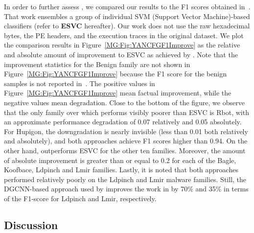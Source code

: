 In order to further assess \sysname, we compared our results to the F1 scores obtained in~\cite{YanDataset}.
That work ensembles a group of individual SVM (Support Vector Machine)-based classifiers (refer to \textbf{ESVC} hereafter). Our work does not use the raw hexadecimal bytes, the PE headers, and the execution traces in the original dataset.%
We plot the comparison results in Figure~\ref{MG:Fig:YANCFGF1Improve} as the relative and absolute amount of improvement to ESVC as achieved by \sysname.
Note that the improvement statistics for the Benign family are not shown in Figure~\ref{MG:Fig:YANCFGF1Improve} because the F1 score for the benign samples is not reported in~\cite{YanDataset}.
The positive values in Figure~\ref{MG:Fig:YANCFGF1Improve} mean factual improvement, while the negative values mean degradation.
Close to the bottom of the figure, we observe that the only family over which \sysname performs visibly poorer than ESVC is Rbot, with an approximate performance degradation of 0.07 relatively and 0.05 absolutely.
For Hupigon, the downgradation is nearly invisible (less than 0.01 both relatively and absolutely), and both approaches achieve F1 scores higher than 0.94.
On the other hand, \sysname outperforms ESVC for the other ten families.
Moreover, the amount of absolute improvement is greater than or equal to 0.2 for each of the Bagle, Koofbace, Ldpinch and Lmir families.
Lastly, it is noted that both approaches performed relatively poorly on the Ldpinch and Lmir malware families. Still, the DGCNN-based approach used by \sysname improves the work in \cite{YanDataset} by 70\% and 35\% in terms of the F1-score for Ldpinch and Lmir, respectively.


\subsection{Discussion}

